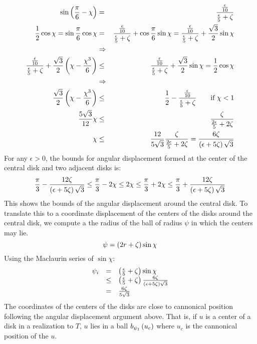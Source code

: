 \begin{eqnarray*}
\sin \left( \frac{\pi}{6} - \chi \right) &=& \frac{\frac{\epsilon}{10}}{\frac{\epsilon}{5}+\zeta}\\
\frac{1}{2}\cos \chi = \sin \frac{\pi}{6} \cos \chi &=& \frac{\frac{\epsilon}{10}}{\frac{\epsilon}{5}+\zeta} + \cos \frac{\pi}{6} \sin \chi = \frac{\frac{\epsilon}{10}}{\frac{\epsilon}{5}+\zeta} +\frac{\sqrt{3}}{2} \sin \chi \\
&\Rightarrow&\\
\frac{\frac{\epsilon}{10}}{\frac{\epsilon}{5}+\zeta}+ \frac{\sqrt{3}}{2} \left(  \chi - \frac{\chi^3}{6} \right) &\leq& \frac{\frac{\epsilon}{10}}{\frac{\epsilon}{5}+\zeta} + \frac{\sqrt{3}}{2} \sin \chi =\frac{1}{2} \cos \chi\\
&\Rightarrow&\\
\frac{\sqrt{3}}{2} \left(  \chi - \frac{\chi^3}{6} \right)&\leq& \frac{1}{2}-\frac{\frac{\epsilon}{10}}{\frac{\epsilon}{5}+\zeta}  \qquad \text{if }\chi < 1 \\
\frac{5\sqrt{3}}{12} \chi &\leq& \frac{  \zeta }{ \frac{2\epsilon}{5} + 2\zeta } \\
\chi&\leq& \frac{12}{5\sqrt{3}}\frac{  \zeta }{ \frac{2\epsilon}{5} + 2\zeta } = \frac{6 \zeta}{\left( \epsilon + 5 \zeta \right)\sqrt{3}}
\end{eqnarray*}
For any $\epsilon > 0$, the bounds for angular displacement formed at the center of the central disk and two adjacent disks is:
$$ \frac{\pi}{3} - \frac{12 \zeta}{\left( \epsilon + 5 \zeta \right)\sqrt{3}}\leq \frac{\pi}{3} - 2 \chi  \leq 2\chi \leq \frac{\pi}{3} + 2 \chi \leq \frac{\pi}{3} + \frac{12 \zeta}{\left( \epsilon + 5 \zeta \right)\sqrt{3}}$$
This shows the bounds of the angular displacement around the central disk.  
To translate this to a coordinate displacement of the centers of the disks around the central disk, we compute a the radius of the ball of radius $\psi$ in which the centers may lie. 
$$\psi = \left( 2 r + \zeta \right) \sin \chi$$
Using the Maclaurin series of $\sin \chi$:
$$
\begin{array}{rcl}
\psi_i &=& \left(  \frac{\epsilon}{5} + \zeta \right) \sin \chi\\
&\leq& \left(  \frac{\epsilon}{5} + \zeta \right) \frac{6 \zeta}{\left( \epsilon + 5 \zeta \right)\sqrt{3}}\\
&=& \frac{6\zeta}{5 \sqrt{3}}
\end{array}
$$
The coordinates of the centers of the disks are close to cannonical position following the angular displacement argument above.  
That is, if $u$ is a center of a disk in a realization to $T$, $u$ lies in a ball $b_{\psi_1}\left( u_c \right)$ where $u_c$ is the cannonical position of the $u$.  


